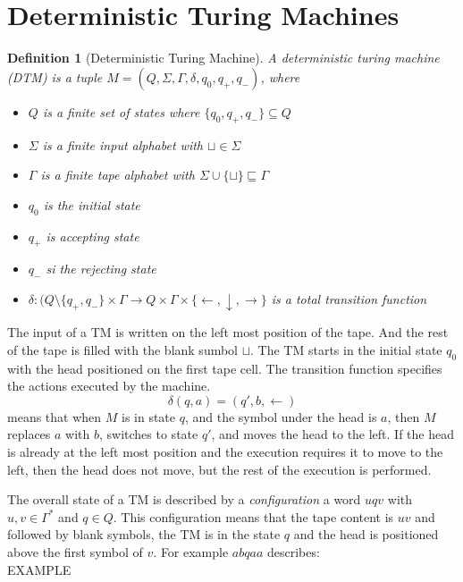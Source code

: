 \documentclass{report}
\newtheorem{definition}{Definition}[chapter]
\begin{document}
\section{Deterministic Turing Machines}\label{sec:turing-machines-det}

\begin{definition}[Deterministic Turing Machine]
A deterministic turing machine (DTM) is a tuple $M = (Q,\Sigma,\Gamma,\delta,q_0,q_+,q_-)$, where
\begin{itemize}
\item[-] $Q$ is a finite set of states where $\{q_0,q_+,q_-\} \subseteq Q$
\item[-] $\Sigma$ is a finite input alphabet with $\sqcup \in \Sigma$
\item[-] $\Gamma$ is a finite tape alphabet with $\Sigma \cup \{\sqcup\} \sqsubseteq \Gamma$
\item[-] $q_0$ is the initial state
\item[-] $q_+$ is accepting state
\item[-] $q_-$ si the rejecting state
\item[-] $\delta: (Q \setminus \{q_+, q_-\} \times \Gamma \rightarrow Q \times \Gamma \times \{\leftarrow,\downarrow,\rightarrow\}$ is a total transition function
\end{itemize}
\end{definition}
The input of a TM is written on the left most position of the tape. And the rest of the tape is filled with the blank sumbol $\sqcup$. The TM starts in the initial state $q_0$ with the head positioned on the first tape cell. The transition function specifies the actions executed by the machine.
\[\delta(q,a) = (q', b, \leftarrow)\]
means that when $M$ is in state $q$, and the symbol under the head is $a$, then $M$ replaces $a$ with $b$, switches to state $q'$, and moves the head to the left. If the head is already at the left most position and the execution requires it to move to the left, then the head does not move, but the rest of the execution is performed.

The overall state of a TM is described by a \textit{configuration} a word $uqv$ with $u,v \in \Gamma^*$ and $q \in Q$. This configuration means that the tape content is $uv$ and followed by blank symbols, the TM is in the state $q$ and the head is positioned above the first symbol of $v$. For example $abqaa$ describes:\\EXAMPLE
\end{document}
